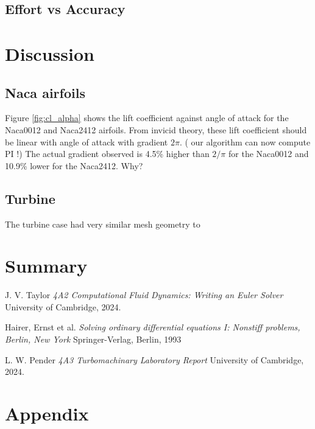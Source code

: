 \documentclass{article}
\begin{document}
\subsection{Effort vs Accuracy}

\section{Discussion}

\subsection{Naca airfoils}

Figure \ref{fig:cl_alpha} shows the lift coefficient against angle of attack for the Naca0012 and Naca2412 airfoils.
From invicid theory, these lift coefficient should be linear with angle of attack with gradient $ 2\pi $. ( our algorithm can now compute PI !)
The actual gradient observed is 4.5\% higher than $2/\pi$ for the Naca0012 and 10.9\% lower for the Naca2412.
Why?

\subsection{Turbine}

The turbine case had very similar mesh geometry to 

\section{Summary}

\begin{thebibliography}{9}

    J. V. Taylor
    \emph{4A2 Computational Fluid Dynamics: Writing an Euler Solver}
    University of Cambridge,
    2024.

    Hairer, Ernst et al.
    \emph{Solving ordinary differential equations I: Nonstiff problems, Berlin, New York}
    Springer-Verlag, Berlin, 1993

    L. W. Pender
    \emph{4A3 Turbomachinary Laboratory Report}
    University of Cambridge,
    2024.
  
\end{thebibliography}

\section{Appendix}
\end{document}
